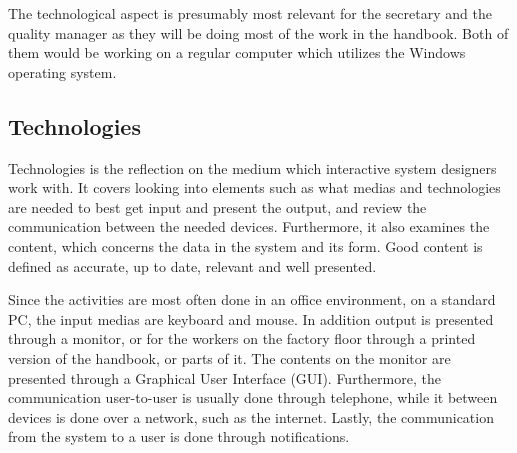 The technological aspect is presumably most relevant for the secretary and the quality manager as they will be doing most of the work in the handbook.
Both of them would be working on a regular computer which utilizes the Windows operating system. %

\subsection{Technologies}
Technologies is the reflection on the medium which interactive system designers work with.
It covers looking into elements such as what medias and technologies are needed to best get input and present the output, and review the communication between the needed devices.
Furthermore, it also examines the content, which concerns the data in the system and its form.
Good content is defined as accurate, up to date, relevant and well presented.

Since the activities are most often done in an office environment, on a standard PC, the input medias are keyboard and mouse.
In addition output is presented through a monitor, or for the workers on the factory floor through a printed version of the handbook, or parts of it.
The contents on the monitor are presented through a Graphical User Interface (GUI).
Furthermore, the communication user-to-user is usually done through telephone, while it between devices is done over a network, such as the internet.
Lastly, the communication from the system to a user is done through notifications.

